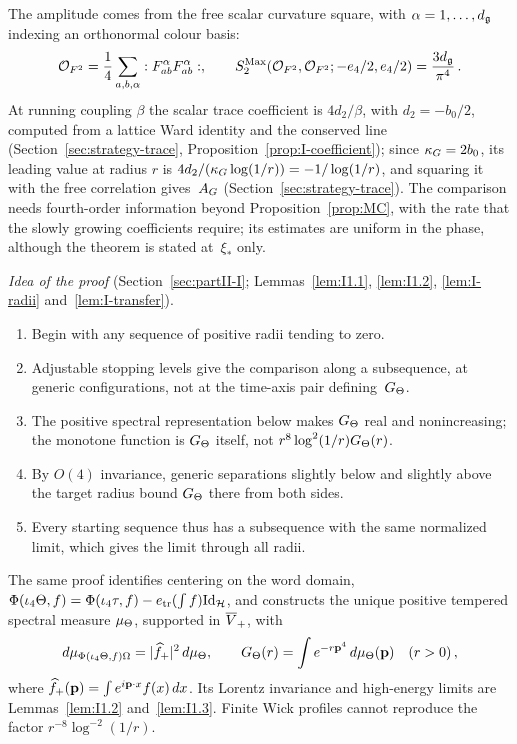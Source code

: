 The amplitude comes from the free scalar curvature square, with $\alpha=1,\ldots,d_{\mathfrak{g}}$ indexing an orthonormal colour basis:
\begin{equation*}
\mathcal{O}_{F^2}=\frac14\sum_{a,b,\alpha}:F_{ab}^{\alpha}F_{ab}^{\alpha}:,\qquad
S^{\mathrm{Max}}_2(\mathcal{O}_{F^2},\mathcal{O}_{F^2};-e_4/2,e_4/2)=\frac{3d_{\mathfrak{g}}}{\pi^4}\,.
\end{equation*}
At running coupling $\beta$ the scalar trace coefficient is $4d_2/\beta$, with $d_2=-b_0/2$, computed from a lattice Ward identity and the conserved line (Section~\ref{sec:strategy-trace}, Proposition~\ref{prop:I-coefficient}); since $\kappa_G=2b_0$, its leading value at radius $r$ is $4d_2/(\kappa_G\log(1/r))=-1/\log(1/r)$, and squaring it with the free correlation gives~$A_G$ (Section~\ref{sec:strategy-trace}). The comparison needs fourth-order information beyond Proposition~\ref{prop:MC}, with the rate that the slowly growing coefficients require; its estimates are uniform in the phase, although the theorem is stated at~$\xi_*$ only.

\emph{Idea of the proof} (Section~\ref{sec:partII-I}; Lemmas~\ref{lem:I1.1}, \ref{lem:I1.2}, \ref{lem:I-radii} and~\ref{lem:I-transfer}).
\begin{enumerate}[label=\textup{Step \arabic*.},leftmargin=4.2em,nosep]
\item Begin with any sequence of positive radii tending to zero.
\item Adjustable stopping levels give the comparison along a subsequence, at generic configurations, not at the time-axis pair defining~$G_{\Theta}$.
\item The positive spectral representation below makes $G_{\Theta}$ real and nonincreasing; the monotone function is $G_{\Theta}$ itself, not $r^8\log^2(1/r)G_{\Theta}(r)$.
\item By $O(4)$ invariance, generic separations slightly below and slightly above the target radius bound $G_{\Theta}$ there from both sides.
\item Every starting sequence thus has a subsequence with the same normalized limit, which gives the limit through all radii.
\end{enumerate}
The same proof identifies centering on the word domain, $\Phi(\iota_4\Theta,f)=\Phi(\iota_4\tau,f)-e_{\rm tr}(\int f)\mathrm{Id}_{\mathcal H}$, and constructs the unique positive tempered spectral measure $\mu_{\Theta}$, supported in $\overline{V}_+$, with
\begin{equation*}
d\mu_{\Phi(\iota_4\Theta,f)\Omega}=|\widehat{f}_{+}|^2\,d\mu_{\Theta},\qquad G_{\Theta}(r)=\int e^{-r\mathbf p^4}\,d\mu_{\Theta}(\mathbf p)\quad(r>0)\,,
\end{equation*}
where $\widehat{f}_{+}(\mathbf p)=\int e^{i\mathbf p\cdot x}f(x)\,dx$. Its Lorentz invariance and high-energy limits are Lemmas~\ref{lem:I1.2} and~\ref{lem:I1.3}. Finite Wick profiles cannot reproduce the factor $r^{-8}\log^{-2}(1/r)$.

